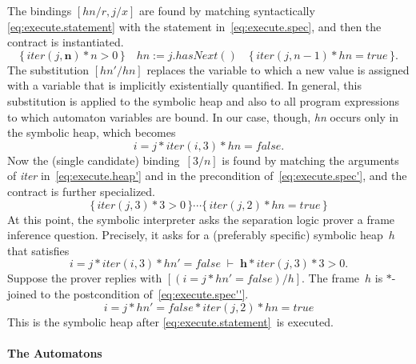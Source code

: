 \documentclass[a4paper]{article}
\theoremstyle{remark}
\begin{document}
The bindings $[\mathit{hn}/r,j/x]$ are found by matching syntactically \eqref{eq:execute.statement} with the statement in~\eqref{eq:execute.spec}, and then the contract is instantiated.
\begin{equation}\label{eq:execute.spec'}
\{\,\mathit{iter}(j, \mathbf{n})*n>0\,\}
  \quad \mathit{hn} := j.\mathit{hasNext}()
  \quad \{\,\mathit{iter}(j, n-1)*\mathit{hn}=\mathit{true}\,\}.
\end{equation}
The substitution $[\mathit{hn}'/\mathit{hn}]$ replaces the variable to which a new value is assigned with a variable that is implicitly existentially quantified.
In general, this substitution is applied to the symbolic heap and also to all program expressions to which automaton variables are bound.
In our case, though, \textit{hn} occurs only in the symbolic heap, which becomes
\begin{equation}\label{eq:execute.heap'}
i=j * \mathit{iter}(i,3) * \mathit{hn} = \mathit{false}.
\end{equation}
Now the (single candidate) binding~$[3/n]$ is found by matching the arguments of \textit{iter} in~\eqref{eq:execute.heap'} and in the precondition of~\eqref{eq:execute.spec'}, and the contract is further specialized.
\begin{equation}\label{eq:execute.spec''}
\{\,\mathit{iter}(j,3)*3>0\,\}\cdots
\{\,\mathit{iter}(j,2)*\mathit{hn}=\mathit{true}\,\}
\end{equation}
At this point, the symbolic interpreter asks the separation logic prover a frame inference question.
Precisely, it asks for a (preferably specific) symbolic heap~$h$ that satisfies
\begin{equation}\label{eq:execute:frame_question}
i=j*\mathit{iter}(i,3)*\mathit{hn}'=\mathit{false}
\;\vdash\;
\mathbf{h}*\mathit{iter}(j,3)*3>0.
\end{equation}
Suppose the prover replies with $[(i=j*\mathit{hn}'=\mathit{false})/h]$.
The frame~$h$ is $*$-joined to the postcondition of~\eqref{eq:execute.spec''}.
\begin{equation}\label{eq:execute.heap''}
i=j*\mathit{hn}'=\mathit{false}*\mathit{iter}(j,2)*\mathit{hn}=\mathit{true}
\end{equation}
This is the symbolic heap after \eqref{eq:execute.statement}~is executed.

\paragraph{The Automatons} %
\end{document}
